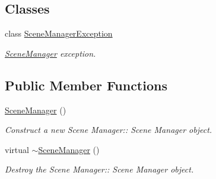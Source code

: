 \subsection*{Classes}
\begin{DoxyCompactItemize}
\item 
class \hyperlink{class_scene_manager_1_1_scene_manager_exception}{Scene\+Manager\+Exception}
\begin{DoxyCompactList}\small\item\em \hyperlink{class_scene_manager}{Scene\+Manager} exception. \end{DoxyCompactList}\end{DoxyCompactItemize}
\subsection*{Public Member Functions}
\begin{DoxyCompactItemize}
\item 
\mbox{\label{class_scene_manager_a52085e6737c23b491c228e86781af808}} 
\hyperlink{class_scene_manager_a52085e6737c23b491c228e86781af808}{Scene\+Manager} ()
\begin{DoxyCompactList}\small\item\em Construct a new Scene Manager\+:\+: Scene Manager object. \end{DoxyCompactList}\item 
\mbox{\label{class_scene_manager_a2bb376a85d29e85f47753e26c7539229}} 
virtual \hyperlink{class_scene_manager_a2bb376a85d29e85f47753e26c7539229}{$\sim$\+Scene\+Manager} ()
\begin{DoxyCompactList}\small\item\em Destroy the Scene Manager\+:\+: Scene Manager object. \end{DoxyCompactList}\end{DoxyCompactItemize}

